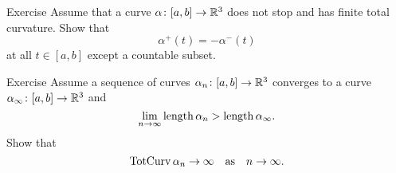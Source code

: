 \begin{thm}{Exercise} 
Assume that a curve $\alpha\colon[a,b]\to\mathbb{R}^3$ does not stop and has finite total curvature.
Show that 
\[\alpha^+(t)=-\alpha^-(t)\]
at all $t\in[a,b]$ except a countable subset.
\end{thm}

\begin{thm}{Exercise} 
Assume a sequence of curves $\alpha_n\colon[a,b]\to\mathbb{R}^3$ converges to a curve $\alpha_\infty\colon[a,b]\to\mathbb{R}^3$ and
\[\lim_{n\to\infty}\mathop{\rm length}\nolimits\alpha_n>\mathop{\rm length}\nolimits\alpha_\infty.\]
Show that 
\[\mathop{\rm TotCurv}\nolimits\alpha_n\to\infty\quad\text{as}\quad n\to\infty.\]

\end{thm}



